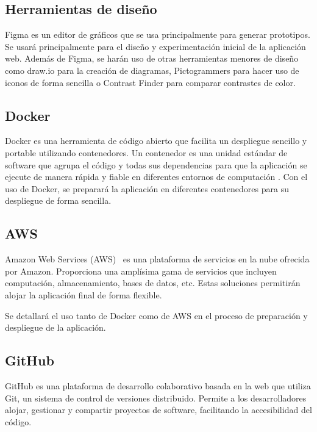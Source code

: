 \subsection{Herramientas de diseño}

Figma \cite{figma} es un editor de gráficos que se usa principalmente para generar prototipos. Se usará principalmente para
el diseño y experimentación inicial de la aplicación web. Además de Figma, se harán uso de otras herramientas
menores de diseño como draw.io \cite{draw.io} para la creación de diagramas, Pictogrammers \cite{pictogrammers} para hacer uso de
iconos de forma sencilla o Contrast Finder \cite{contrastFinder} para comparar contrastes de color.

\subsection{Docker}

Docker \cite{docker} es una herramienta de código abierto que facilita un despliegue sencillo y portable utilizando contenedores. 
Un contenedor es una unidad estándar de software que agrupa el código y todas sus dependencias para que la aplicación se ejecute de 
manera rápida y fiable en diferentes entornos de computación \cite{dockerContainer}. Con el uso de Docker, se preparará la aplicación 
en diferentes contenedores para su despliegue de forma sencilla.

\subsection{AWS}

Amazon Web Services (AWS)~\cite{aws} es una plataforma de servicios en la nube ofrecida por Amazon. Proporciona
una amplísima gama de servicios que incluyen computación, almacenamiento, bases de datos, etc. Estas soluciones permitirán
alojar la aplicación final de forma flexible.

Se detallará el uso tanto de Docker como de AWS en el proceso de preparación y despliegue de la aplicación.

\subsection{GitHub}

GitHub \cite{github} es una plataforma de desarrollo colaborativo basada en la web que utiliza Git, un sistema de control de versiones
distribuido. Permite a los desarrolladores alojar, gestionar y compartir proyectos de software, facilitando la accesibilidad
del código.

